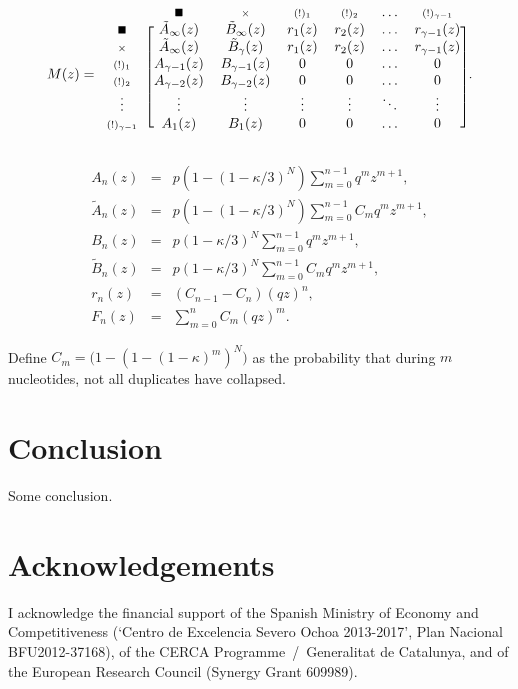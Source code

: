 \documentclass{article}
\begin{document}
\begin{equation*}
M(z) =
\begin{blockarray}{ccccccc}
   & \scriptstyle{\blacksquare} & \scriptstyle{\times} 
   & \scriptstyle{(!)_1} & \scriptstyle{(!)_2}
   & \ldots & \scriptstyle{(!)_{\gamma-1}} \\
\begin{block}{c[cccccc]}
\scriptstyle{\blacksquare} & \tilde{A}_\infty(z) & \tilde{B}_\infty(z) &
    r_1(z) & r_2(z) & \ldots & r_{\gamma-1}(z) \\
\scriptstyle{\times} & \tilde{A}_\infty(z) & \tilde{B}_\gamma(z) &
    r_1(z) & r_2(z) & \ldots & r_{\gamma-1}(z) \\
\scriptstyle{(!)_1} & A_{\gamma-1}(z) & B_{\gamma-1}(z) & 0 & 0 &
    \ldots & 0 \\
\scriptstyle{(!)_2} & A_{\gamma-2}(z) & B_{\gamma-2}(z) & 0 & 0 &
    \ldots & 0  \\
\vdots & \vdots & \vdots & \vdots & \vdots & \ddots & \vdots \\
\scriptstyle{(!)_{\gamma-1}} & A_1(z) & B_1(z) & 0 & 0 & \ldots & 0 \\
\end{block}
\end{blockarray}.
\end{equation*}

\begin{eqnarray*}
A_n(z) &=& p (1-(1-\kappa/3)^N) \sum_{m=0}^{n-1} q^mz^{m+1}, \\
\tilde{A}_n(z) &=& p (1-(1-\kappa/3)^N)
    \sum_{m=0}^{n-1} C_m q^mz^{m+1}, \\
B_n(z) &=& p(1-\kappa/3)^N \sum_{m=0}^{n-1} q^mz^{m+1}, \\
\tilde{B}_n(z) &=& p(1-\kappa/3)^N \sum_{m=0}^{n-1} C_m q^mz^{m+1}, \\
r_n(z) &=& (C_{n-1}-C_n) (qz)^n, \\
F_n(z) &=& \sum_{m=0}^n C_m (qz)^m.
\end{eqnarray*}

Define $C_m = \big( 1- (1-(1-\kappa)^m)^N \big)$ as the probability that
during $m$ nucleotides, not all duplicates have collapsed.

\section{Conclusion}
Some conclusion.

\section*{Acknowledgements}

I acknowledge the financial support of the Spanish Ministry of Economy and
Competitiveness (‘Centro de Excelencia Severo Ochoa 2013-2017’, Plan
Nacional BFU2012-37168), of the CERCA Programme~/~Generalitat de
Catalunya, and of the European Research Council (Synergy Grant 609989).






\end{document}
